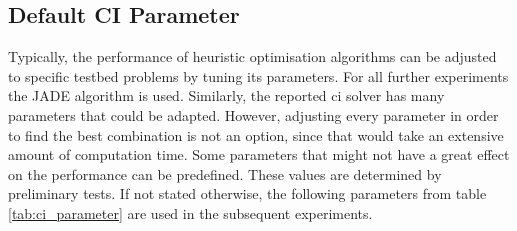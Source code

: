 \documentclass[./\jobname.tex]{subfiles}
\begin{document}
\subsection{Default CI Parameter}
\label{chap:default_ci_param}
Typically, the performance of heuristic optimisation algorithms can be adjusted to specific testbed problems by tuning its parameters. For all further experiments the JADE algorithm is used. Similarly, the reported \gls{ci} solver has many parameters that could be adapted. However, adjusting every parameter in order to find the best combination is not an option, since that would take an extensive amount of computation time. Some parameters that might not have a great effect on the performance can be predefined. These values are determined by preliminary tests. If not stated otherwise, the following parameters from table \ref{tab:ci_parameter} are used in the subsequent experiments. 
\end{document}
